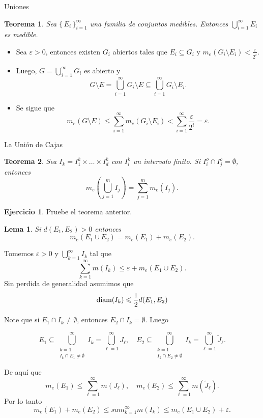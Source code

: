 \documentclass[utf8]{beamer}
\theoremstyle{plain}
\newtheorem{Th}{Teorema}               %
\newtheorem{Lem}{Lema}                 %
\theoremstyle{definition}
\newtheorem{Ej}{Ejercicio}             %
\theoremstyle{remark}
\numberwithin{equation}{section}
\newcommand{\eps}{\varepsilon}          %
\newcommand{\set}[1]{\{\,#1\,\}}    %
\newcommand{\x}{\times}
\renewcommand{\l}{\ell}                   %
\renewcommand{\leq}{\leqslant}          %
\newcommand{\less}{\setminus}           %
\newcommand{\half}{{\mathchoice{\nhalf}{\thalf}{\shalf}{\shalf}}} %
\newcommand{\nhalf}{\frac{1}{2}}
\newcommand{\shalf}{{\scriptstyle\frac{1}{2}}} %
\newcommand{\thalf}{{\tfrac{1}{2}}} %
\newcommand{\suci}{_{i=1}^\infty} %
\newcommand{\suck}{_{k=1}^\infty} %
\newcommand{\sucl}{_{\l=1}^\infty} %
\renewcommand{\.}{\Cdot}                %
\begin{document}
\begin{frame}{Uniones}
  \begin{Th}\label{thm:unionDeMedibles}
  Sea $\set{E_i}\suci$ una familia de conjuntos medibles. Entonces $\bigcup\suci E_i$ es medible.
  \end{Th}
  
\end{frame}

\begin{frame}
  \begin{itemize}
    \item Sea $\eps>0$, entonces existen $G_i$ abiertos tales que $E_i\subseteq G_i$ y $m_e(G_i\less E_i)<\frac{\eps}{2^i}$. 
    \item Luego, $G=\bigcup\suci G_i$ es abierto y 
     $$G\less E=\bigcup\suci G_i\less E\subseteq \bigcup\suci G_i\less E_i.$$
     \item Se sigue que 
     $$m_e(G\less E)\leq \sum\suci m_e(G_i\less E_i)<\sum\suci\frac{\eps}{2^i}=\eps.$$
  \end{itemize}
\end{frame}

\begin{frame}{La Unión de Cajas}
  \begin{Th}\label{thm:UnionDeCajas}
    Sea $I_k=I_1^k\x\dots\x I_d^k$ con $I_i^k$ un intervalo finito. Si $I_i^o\cap I_j^o=\emptyset$, entonces 
    $$m_e\left(\bigcup_{j=1}^mI_j\right)=\sum_{j=1}^mm_e(I_j).$$  
  \end{Th}
  \begin{Ej}
    Pruebe el teorema anterior.
  \end{Ej}
\end{frame}

\begin{frame}
  \begin{Lem}\label{lem:ADistPositiva}
    Si $d(E_1,E_2)>0$ entonces 
    $$m_e(E_1\cup E_2)=m_e(E_1)+m_e(E_2).$$
  \end{Lem}
  Tomemos $\eps>0$ y $\bigcup\suck I_k$ tal que 
  $$\sum\suck m(I_k)\leq \eps+m_e(E_1\cup E_2).$$
  Sin perdida de generalidad asumimos que 
  $$\text{diam}(I_k)\leq\half d(E_1,E_2)$$
\end{frame}

\begin{frame}
  Note que si $E_1\cap I_k\neq \emptyset$, entonces $E_2\cap I_k=\emptyset$. Luego 

   $$E_1\subseteq \bigcup_{\substack{k=1\\ I_k\cap E_1\neq\emptyset}}^\infty I_k=\bigcup\sucl J_\l,\quad E_2\subseteq \bigcup_{\substack{k=1\\ I_k\cap E_2\neq\emptyset}}^\infty I_k=\bigcup\sucl \tilde J_\l.$$

  De aquí que 
 $$m_e(E_1)\leq\sum\sucl m(J_\l),\quad m_e(E_2)\leq \sum\sucl m(\tilde{J}_\l).$$
 Por lo tanto 
 $$m_e(E_1)+m_e(E_2)\leq sum\suck m(I_k)\leq m_e(E_1\cup E_2)+\eps.$$ 
\end{frame}
\end{document}
